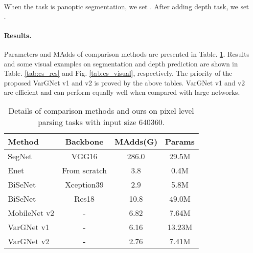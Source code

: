 \documentclass{article}
\begin{document}
When the task is panoptic segmentation, we set . After adding depth task, we set .

\paragraph{Results.} Parameters and MAdds of comparison methods are presented in Table. \ref{tab:cs_com}.
Results and some visual examples on segmentation and depth prediction are shown in Table. \ref{tab:cs_res} and Fig. \ref{tab:cs_visual}, respectively. The priority of the proposed VarGNet v1 and v2 is proved by the above tables. VarGNet v1 and v2 are efficient and can perform equally well when compared with large networks.

\begin{table}
  \centering
  \caption{Details of comparison methods and ours on pixel level parsing tasks with input size 640360.}\label{tab:cs_com}
  \begin{tabular}{lccc}
  \toprule
  Method & Backbone & MAdds(G) & Params \\ \midrule
  SegNet\cite{badrinarayanan2017segnet} & VGG16 & 286.0 & 29.5M \\
  Enet\cite{paszke2016enet} & From scratch & 3.8 & 0.4M \\
  BiSeNet\cite{yu2018bisenet} & Xception39 & 2.9 & 5.8M \\
  BiSeNet\cite{yu2018bisenet} & Res18 & 10.8 & 49.0M \\ \midrule
  MobileNet v2 & - & 6.82 &	7.64M \\ \midrule
  VarGNet v1 & - & 6.16 & 13.23M \\
  VarGNet v2  & - & 2.76 & 7.41M \\
\bottomrule
  \end{tabular}
\end{table}
\end{document}
